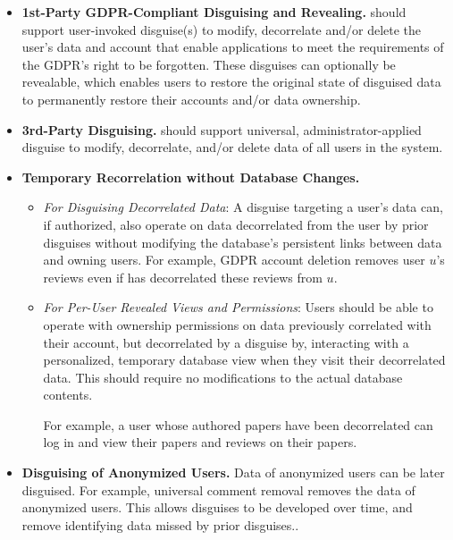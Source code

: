 \begin{itemize}
    \item\textbf{1st-Party GDPR-Compliant Disguising and Revealing.}
\sys should support user-invoked disguise(s) to modify, decorrelate and/or delete the user's data and
account that enable applications to meet the requirements of the GDPR's right to be
forgotten.
%
These disguises can optionally be revealable, which enables users to restore the original state of
        disguised data to \eg permanently restore their accounts and/or data ownership.

\item\textbf{3rd-Party Disguising.}
\sys should support universal, administrator-applied disguise to modify, decorrelate, and/or delete
        data of all users in the system.

\item\textbf{Temporary Recorrelation without Database Changes.}
    \begin{itemize}
        \item \emph{For Disguising Decorrelated Data}: 
        A disguise targeting a user's data can, if authorized, also operate on data decorrelated
            from the user by prior disguises without modifying the database's persistent links
            between data and owning users. For example, GDPR account deletion removes user $u$'s
            reviews even if \sys has decorrelated these reviews from $u$.

    \item \emph{For Per-User Revealed Views and Permissions}:
            Users should be able to operate with ownership permissions on data previously correlated
            with their account, but decorrelated by a disguise by, interacting with a personalized,
            temporary database view when they visit their decorrelated data. This should require no
            modifications to the actual database contents.

            For example, a user whose authored papers have been decorrelated can log in and view their
            papers and reviews on their papers.
\end{itemize}

\item\textbf{Disguising of Anonymized Users.}
Data of anonymized users can be later disguised.  For example, universal comment removal removes the
        data of anonymized users.
This allows disguises to be developed over time, and remove identifying data missed by prior
        disguises..
\end{itemize}

